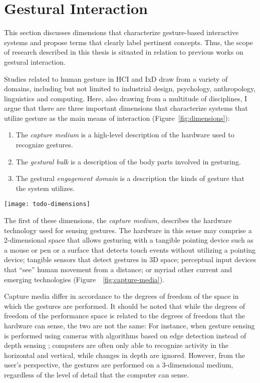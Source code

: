 \section{Gestural Interaction}

This section discusses dimensions that characterize gesture-based interactive systems and propose terms that clearly label pertinent concepts. Thus, the scope of research described in this thesis is situated in relation to previous works on gestural interaction.

Studies related to human gesture in HCI and IxD draw from a variety of domains, including but not limited to industrial design, psychology, anthropology, linguistics and computing. Here, also drawing from a multitude of disciplines, I argue that there are three important dimensions that characterize systems that utilize gesture as the main means of interaction (Figure~\ref{fig:dimensions}):

\begin{enumerate}
\item The \emph{capture medium} is a high-level description of the hardware used to recognize gestures.
\item	The \emph{gestural bulk} is a description of the body parts involved in gesturing.
\item The gestural \emph{engagement domain} is a description the kinds of gesture that the system utilizes.
\end{enumerate}

\begin{SCfigure}[\sidecaptionrelwidth][ht]
\centering
\texttt{[image: todo-dimensions]}
\caption{Visualizing the three dimensions that characterize gesture-based interactive systems.}
\label{fig:dimensions}
\end{SCfigure}

The first of these dimensions, the \emph{capture medium}, describes the hardware technology used for sensing gestures. The hardware in this sense may comprise a 2-dimensional space that allows gesturing with a tangible pointing device such as a mouse or pen or a surface that detects touch events without utilizing a pointing device; tangible sensors that detect gestures in 3D space; perceptual input devices that “see” human movement from a distance; or myriad other current and emerging technologies (Figure~~\ref{fig:capture-media}).

Capture media differ in accordance to the degrees of freedom of the space in which the gestures are performed. It should be noted that while the degrees of freedom of the performance space is related to the degrees of freedom that the hardware can sense, the two are not the same: For instance, when gesture sensing is performed using cameras with algorithms based on edge detection instead of depth sensing \parencite{Moeslund:2001, Moeslund:2006}; computers are often only able to recognize activity in the horizontal and vertical, while changes in depth are ignored. However, from the user’s perspective, the gestures are performed on a 3-dimensional medium, regardless of the level of detail that the computer can sense.

